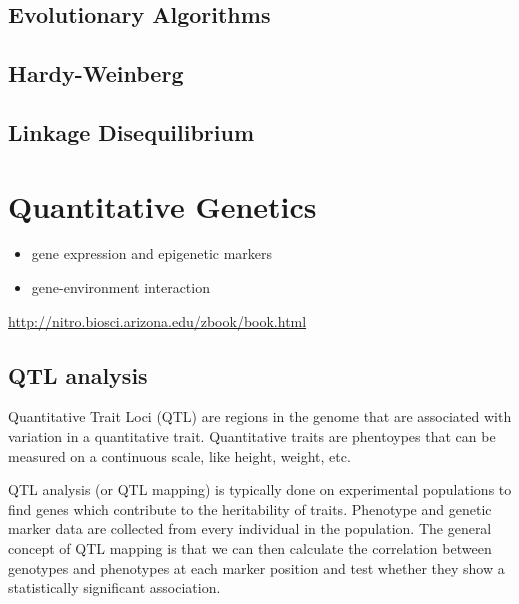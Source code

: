 \documentclass[12pt,]{krantz}
\theoremstyle{definition}
\theoremstyle{definition}
\theoremstyle{definition}
\theoremstyle{remark}
\begin{document}
\section{Evolutionary Algorithms}\label{evolutionary-algorithms}

\section{Hardy-Weinberg}\label{hardy-weinberg}

\section{Linkage Disequilibrium}\label{linkage-disequilibrium}

\chapter{Quantitative Genetics}\label{quantitative-genetics}

\begin{itemize}
\item
  gene expression and epigenetic markers
\item
  gene-environment interaction
\end{itemize}

\url{http://nitro.biosci.arizona.edu/zbook/book.html}

\section{QTL analysis}\label{qtl-analysis}

Quantitative Trait Loci (QTL) are regions in the genome that are
associated with variation in a quantitative trait. Quantitative traits
are phentoypes that can be measured on a continuous scale, like height,
weight, etc.

QTL analysis (or QTL mapping) is typically done on experimental
populations to find genes which contribute to the heritability of
traits. Phenotype and genetic marker data are collected from every
individual in the population. The general concept of QTL mapping is that
we can then calculate the correlation between genotypes and phenotypes
at each marker position and test whether they show a statistically
significant association.
\end{document}
